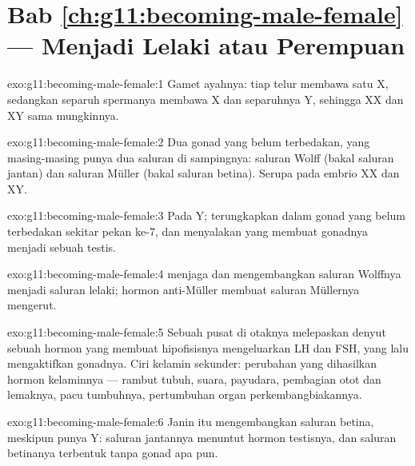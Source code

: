 \section*{Bab \ref{ch:g11:becoming-male-female} --- Menjadi Lelaki atau Perempuan}

\begin{solution}{exo:g11:becoming-male-female:1}
Gamet ayahnya: tiap  telur membawa satu X, sedangkan separuh
spermanya membawa X dan separuhnya Y, sehingga XX dan XY sama mungkinnya.
\end{solution}

\begin{solution}{exo:g11:becoming-male-female:2}
Dua gonad yang belum terbedakan, yang masing-masing punya dua saluran
di sampingnya: saluran Wolff (bakal saluran jantan) dan saluran Müller
(bakal saluran betina). Serupa pada embrio XX dan XY.
\end{solution}

\begin{solution}{exo:g11:becoming-male-female:3}
Pada  Y; terungkapkan dalam gonad yang belum terbedakan sekitar
pekan ke-7, dan  menyalakan  yang membuat gonadnya menjadi
sebuah testis.
\end{solution}

\begin{solution}{exo:g11:becoming-male-female:4}
 menjaga dan mengembangkan saluran Wolffnya menjadi saluran
lelaki; hormon anti-Müller membuat saluran Müllernya mengerut.
\end{solution}

\begin{solution}{exo:g11:becoming-male-female:5}
Sebuah pusat di otaknya melepaskan denyut sebuah hormon yang membuat
hipofisisnya mengeluarkan LH dan FSH, yang lalu mengaktifkan gonadnya.
Ciri kelamin sekunder: perubahan yang dihasilkan hormon kelaminnya ---
rambut tubuh, suara, payudara, pembagian otot dan lemaknya, pacu
tumbuhnya, pertumbuhan organ perkembangbiakannya.
\end{solution}

\begin{solution}{exo:g11:becoming-male-female:6}
Janin itu mengembangkan saluran betina, meskipun punya  Y:
saluran jantannya menuntut hormon testisnya, dan saluran betinanya
terbentuk tanpa gonad apa pun.
\end{solution}

